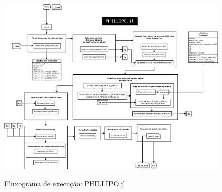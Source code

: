 \begin{figure}
    \centering
    \caption{Fluxograma de execução: PHILLIPO.jl}
    \includegraphics[width = \textwidth]{Figuras/fluxograma_PHILLIPO.pdf}
    \label{fig:fluxograma_PHILLIPO}
\end{figure}